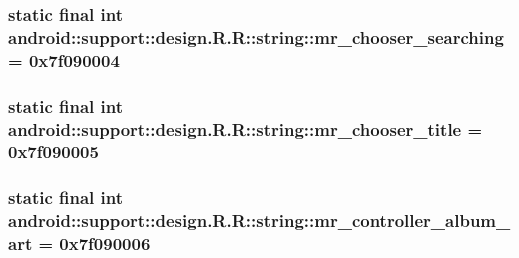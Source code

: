 \hypertarget{classandroid_1_1support_1_1design_1_1_r_1_1string_be2d97f6b3ca4444064e5df7d43f8d38}{
\subsubsection[{mr\_\-chooser\_\-searching}]{\setlength{\rightskip}{0pt plus 5cm}static final int android::support::design.R.R::string::mr\_\-chooser\_\-searching = 0x7f090004}}
\label{classandroid_1_1support_1_1design_1_1_r_1_1string_be2d97f6b3ca4444064e5df7d43f8d38}


\hypertarget{classandroid_1_1support_1_1design_1_1_r_1_1string_9d2247cda54fedb3bdd467047a3da0ac}{
\subsubsection[{mr\_\-chooser\_\-title}]{\setlength{\rightskip}{0pt plus 5cm}static final int android::support::design.R.R::string::mr\_\-chooser\_\-title = 0x7f090005}}
\label{classandroid_1_1support_1_1design_1_1_r_1_1string_9d2247cda54fedb3bdd467047a3da0ac}


\hypertarget{classandroid_1_1support_1_1design_1_1_r_1_1string_52018b1cdbd6f7f2a80bdeb84832e62a}{
\subsubsection[{mr\_\-controller\_\-album\_\-art}]{\setlength{\rightskip}{0pt plus 5cm}static final int android::support::design.R.R::string::mr\_\-controller\_\-album\_\-art = 0x7f090006}}
\label{classandroid_1_1support_1_1design_1_1_r_1_1string_52018b1cdbd6f7f2a80bdeb84832e62a}


